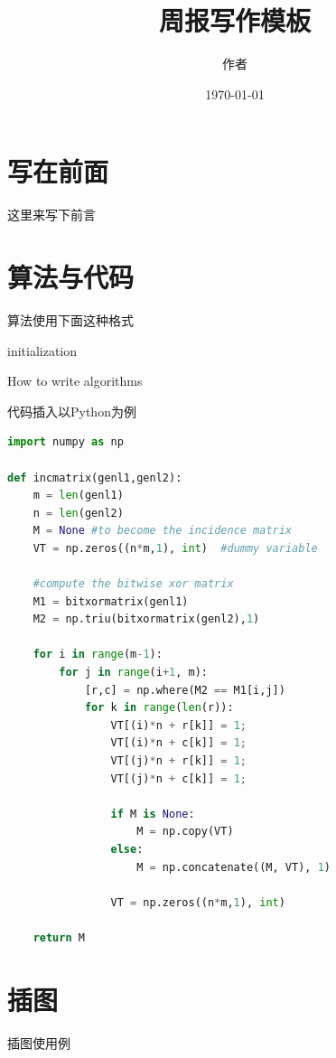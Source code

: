 \documentclass[a4paper]{article}
\title{周报写作模板}
\author{作者}
\date{\today}
\begin{document}
\maketitle

\section{写在前面}

这里来写下前言

\section{算法与代码}
算法使用下面这种格式

\begin{algorithm}[H]
\SetAlgoLined
{}
 initialization\;
 
 \caption{How to write algorithms}
\end{algorithm}


代码插入以Python为例
\begin{lstlisting}[language=Python, caption=Python example]
import numpy as np
    
def incmatrix(genl1,genl2):
    m = len(genl1)
    n = len(genl2)
    M = None #to become the incidence matrix
    VT = np.zeros((n*m,1), int)  #dummy variable
    
    #compute the bitwise xor matrix
    M1 = bitxormatrix(genl1)
    M2 = np.triu(bitxormatrix(genl2),1) 

    for i in range(m-1):
        for j in range(i+1, m):
            [r,c] = np.where(M2 == M1[i,j])
            for k in range(len(r)):
                VT[(i)*n + r[k]] = 1;
                VT[(i)*n + c[k]] = 1;
                VT[(j)*n + r[k]] = 1;
                VT[(j)*n + c[k]] = 1;
                
                if M is None:
                    M = np.copy(VT)
                else:
                    M = np.concatenate((M, VT), 1)
                
                VT = np.zeros((n*m,1), int)
    
    return M
\end{lstlisting}


\section{插图}
插图使用例
\end{document}

